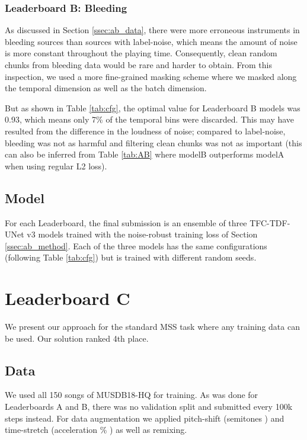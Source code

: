 \documentclass[10pt]{article}
\begin{document}
\subsubsection{Leaderboard B: Bleeding}
\label{sssec:ab_method_b}
As discussed in Section \ref{ssec:ab_data}, there were more erroneous instruments in bleeding sources than sources with label-noise, which means the amount of noise is more constant throughout the playing time. Consequently, clean random chunks from bleeding data would be rare and harder to obtain. From this inspection, we used a more fine-grained masking scheme where we masked along the temporal dimension as well as the batch dimension. 

But as shown in Table \ref{tab:cfg}, the optimal  value for Leaderboard B models was 0.93, which means only 7\% of the temporal bins were discarded. This may have resulted from the difference in the loudness of noise; compared to label-noise, bleeding was not as harmful and filtering clean chunks was not as important (this can also be inferred from Table \ref{tab:AB} where modelB outperforms modelA when using regular L2 loss).

\subsection{Model}
\label{ssec:ab_model}
For each Leaderboard, the final submission is an ensemble of three TFC-TDF-UNet v3 models trained with the noise-robust training loss of Section \ref{ssec:ab_method}. Each of the three models has the same configurations (following Table \ref{tab:cfg}) but is trained with different random seeds. 





\section{Leaderboard C}
\label{sec:c}
We present our approach for the standard MSS task where any training data can be used. Our solution ranked 4th place. 

\subsection{Data}
\label{ssec:c_data}
We used all 150 songs of MUSDB18-HQ for training. As was done for Leaderboards A and B, there was no validation split and submitted every 100k steps instead. For data augmentation we applied pitch-shift (semitones ) and time-stretch (acceleration \% ) as well as remixing. 
\end{document}

